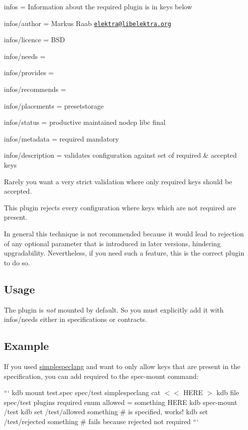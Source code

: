 
\begin{DoxyItemize}
\item infos = Information about the required plugin is in keys below
\item infos/author = Markus Raab \href{mailto:elektra@libelektra.org}{\tt elektra@libelektra.\+org}
\item infos/licence = B\+SD
\item infos/needs =
\item infos/provides =
\item infos/recommends =
\item infos/placements = presetstorage
\item infos/status = productive maintained nodep libc final
\item infos/metadata = required mandatory
\item infos/description = validates configuration against set of required \& accepted keys
\end{DoxyItemize}

Rarely you want a very strict validation where only required keys should be accepted.

This plugin rejects every configuration where keys which are not required are present.

In general this technique is not recommended because it would lead to rejection of any optional parameter that is introduced in later versions, hindering upgradability. Nevertheless, if you need such a feature, this is the correct plugin to do so.

\subsection*{Usage}

The plugin is {\itshape not} mounted by default. So you must explicitly add it with {\ttfamily infos/needs} either in specifications or contracts.

\subsection*{Example}

If you used \hyperlink{md_src_plugins_simplespeclang_README_src_plugins_simplespeclang_README_md}{simplespeclang} and want to only allow keys that are present in the specification, you can add {\ttfamily required} to the {\ttfamily spec-\/mount} command\+:

``` kdb mount test.\+spec spec/test simplespeclang cat $<$$<$ H\+E\+RE $>$ {\ttfamily kdb file spec/test} plugins required enum allowed = something H\+E\+RE kdb spec-\/mount /test kdb set /test/allowed something \# is specified, works! kdb set /test/rejected something \# fails because rejected not required ``` 